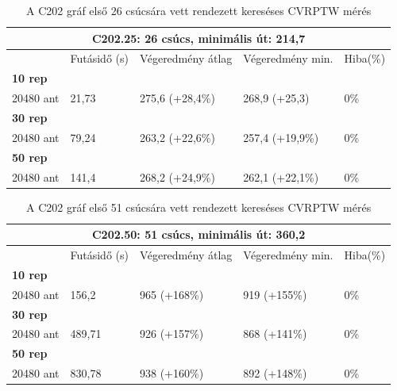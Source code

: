 \begin{table}[ht!]
	\centering
	\begin{tabular}{|p{1.75cm}||p{2cm}|p{3.25cm}|p{3.25cm}|p{1.5cm}|}
		\hline
		\multicolumn{5}{|c|}{C202.25: 26 csúcs, minimális út: 214,7} \\
		\hline
		& Futásidő (s) & Végeredmény átlag & Végeredmény min. & Hiba(\%) \\
		\hline
		\textbf{10 rep} &  &  &  & \\
		20480 ant & 21,73 & 275,6 (+28,4\%) & 268,9 (+25,3) &  0\% \\
		\hline
		\textbf{30 rep} &  &  &  & \\
		20480 ant & 79,24 & 263,2 (+22,6\%) & 257,4 (+19,9\%) &  0\% \\
		\hline
		\textbf{50 rep} &  &  &  &  \\
		20480 ant & 141,4 & 268,2 (+24,9\%) & 262,1 (+22,1\%) &  0\% \\
		\hline
	\end{tabular}
	\caption{A C202 gráf első 26 csúcsára vett rendezett kereséses CVRPTW mérés}
	\label{table:VRTPW2_25_3}
\end{table}

\begin{table}[ht!]
	\centering
	\begin{tabular}{|p{1.75cm}||p{2cm}|p{3.25cm}|p{3.25cm}|p{1.5cm}|}
		\hline
		\multicolumn{5}{|c|}{C202.50: 51 csúcs, minimális út: 360,2} \\
		\hline
		& Futásidő (s) & Végeredmény átlag & Végeredmény min. & Hiba(\%) \\
		\hline
		\textbf{10 rep} &  &  &  & \\
		20480 ant & 156,2 & 965 (+168\%) & 919 (+155\%) &  0\% \\
		\hline
		\textbf{30 rep} &  &  &  & \\
		20480 ant & 489,71 & 926 (+157\%) & 868 (+141\%) &  0\% \\
		\hline
		\textbf{50 rep} &  &  &  &  \\
		20480 ant & 830,78 & 938 (+160\%) & 892 (+148\%) &  0\% \\
		\hline
	\end{tabular}
	\caption{A C202 gráf első 51 csúcsára vett rendezett kereséses CVRPTW mérés}
	\label{table:VRTPW2_50_3}
\end{table}

